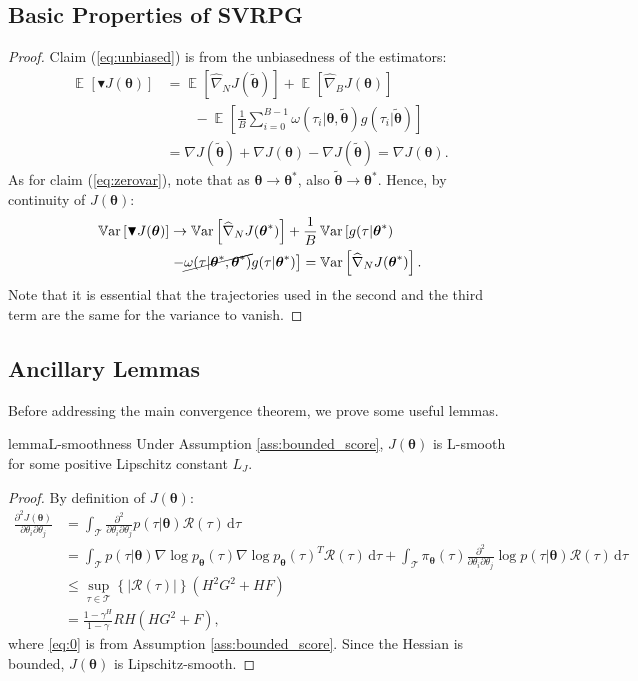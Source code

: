\documentclass{article}
\theoremstyle{remark}
\theoremstyle{definition}
\DeclareMathOperator*{\EV}{\mathbb{E}}
\DeclareMathOperator*{\Var}{\mathbb{V}ar}
\newcommand{\EVV}[2][\ppvect \in \ppspace]{\EV_{#1}\left[{#2}\right]}
\newcommand{\Dij}[2]{\frac{\partial^{2}{#1}}{\partial{#2}_i\partial{#2}_j}}
\newcommand{\de}{\,\mathrm{d}}
\newcommand{\vtheta}{\boldsymbol{\theta}}
\newcommand{\Tspace}{\mathcal{T}}
\newcommand{\Reward}{\mathcal{R}}
\newcommand{\pol}{\pi_{\vtheta}}
\newcommand{\score}[2]{\nabla\log p_{#1}(#2)}
\newcommand{\gradJ}[1]{\nabla J(#1)}
\newcommand{\gradApp}[2]{\widehat{\nabla}_{#2}J(#1)}
\newcommand{\gradBlack}[1]{\blacktriangledown J(#1)}
\newcommand{\GRADLOG}{G}
\newcommand{\HESSLOG}{F}
\newcommand{\wt}[1]{\widetilde{#1}}
\begin{document}
\subsection*{Basic Properties of SVRPG}
\properties*
\begin{proof}
	Claim (\ref{eq:unbiased}) is from the unbiasedness of the estimators:
	\begin{align*}
	\EVV[]{\gradBlack{\vtheta}} &= \EVV[]{\gradApp{\wt{\vtheta}}{N}}  + \EVV[]{\gradApp{\vtheta}{B}} \\
	&\qquad- \EVV[]{\frac{1}{B}\sum_{i=0}^{B-1}\omega(\tau_i|\vtheta, \wt{\vtheta}) g(\tau_i|\wt{\vtheta})} \\
	&= \gradJ{\wt{\vtheta}} + \gradJ{\vtheta} - \gradJ{\wt{\vtheta}} = \gradJ{\vtheta}.
	\end{align*}
	As for claim (\ref{eq:zerovar}), note that as $\vtheta\to\vtheta^*$, also $\wt{\vtheta}\to\vtheta^*$. Hence, by continuity of $J(\vtheta)$:
	\begin{align*}
	\Var\left[\gradBlack{\vtheta}\right] &\to \Var\left[\gradApp{\vtheta^*}{N}\right] + \frac{1}{B}\Var\left[g(\tau|\vtheta^*)\right. \\
	&\left.- \cancel{\omega(\tau|\vtheta^*,\vtheta^*)}g(\tau|\vtheta^*)\right]
	= \Var\left[\gradApp{\vtheta^*}{N}\right].
	\end{align*}
	Note that it is essential that the trajectories used in the second and the third term are the same for the variance to vanish.
\end{proof}

\subsection*{Ancillary Lemmas}
Before addressing the main convergence theorem, we prove some useful lemmas.

 
\begin{restatable}[]{lemma}{L-smoothness}\label{lemma:lsmooth}
	Under Assumption \ref{ass:bounded_score}, $J(\vtheta)$ is L-smooth for some positive Lipschitz constant $L_J$.
\end{restatable}
\begin{proof}
By definition of $J(\vtheta)$:
\begin{align}
\Dij{J(\vtheta)}{\theta} 
&= \int_{\Tspace}\Dij{}{\theta}p(\tau|\vtheta)\Reward(\tau)\de \tau
\nonumber\\ 
&= \int_{\Tspace}p(\tau|\vtheta)\score{\vtheta}{\tau}\score{\vtheta}{\tau}^T\Reward(\tau)\de \tau + \int_{\Tspace}\pol(\tau)\Dij{}{\theta}\log p(\tau|\vtheta)\Reward(\tau)\de \tau \nonumber\\
&\leq \sup_{\tau \in \mathcal{T}} \left\{\left|\Reward(\tau)\right|\right\} \left(H^2\GRADLOG^2+H\HESSLOG\right) \label{eq:0}\\
&= \frac{1-\gamma^H}{1-\gamma}RH\left(H\GRADLOG^2+\HESSLOG\right),\nonumber
\end{align}
where \ref{eq:0} is from Assumption \ref{ass:bounded_score}.
Since the Hessian is bounded, $J(\vtheta)$ is Lipschitz-smooth.
\end{proof}
\end{document}
